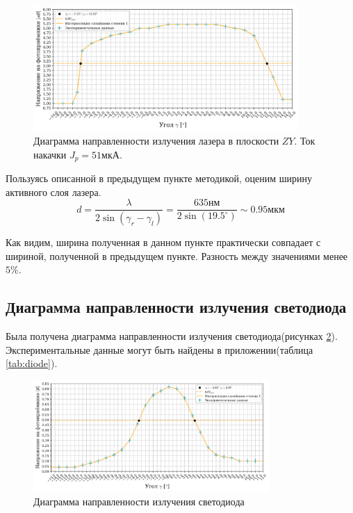 \documentclass[a4paper, 12pt]{extarticle}
\begin{document}
\begin{figure}[htbp]
    \centering
    \includegraphics[width = 0.9\textwidth]{pics/lazer_horizontal_51.png}
    \caption{Диаграмма направленности излучения лазера в плоскости $ZY$. Ток накачки $J_p = 51\text{мкА}$.}
    \label{fig:ZY_51}
\end{figure}

Пользуясь описанной в предыдущем пункте методикой, оценим ширину активного слоя лазера.
$$
d = \frac{\lambda}{2 \sin(\gamma_r - \gamma_l)} = \frac{635 \text{нм}}{2 \sin(19.5^{\circ})} \sim 0.95 \text{мкм}
$$

Как видим, ширина полученная в данном пункте практически совпадает с шириной, полученной в предыдущем пункте. Разность между значениями менее $5\%$.

\subsection*{\textcolor{sub_header}{Диаграмма направленности излучения светодиода}}

Была получена диаграмма направленности излучения светодиода(рисунках \ref{fig:diode}). Экспериментальные данные могут быть найдены в приложении(таблица \ref{tab:diode}).

\begin{figure}[htbp]
    \centering
    \includegraphics[width = 0.8\textwidth]{pics/diode.png}
    \caption{Диаграмма направленности излучения светодиода}
    \label{fig:diode}
\end{figure}
\end{document}
